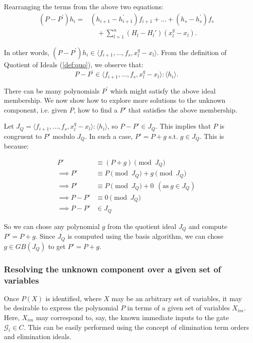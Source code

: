 Rearranging the terms from the above two equations:
\begin{equation}
  \begin{split}
(P-P^{'})h_i = &
    (h_{i+1}-h_{i+1}^{'})f_{i+1}+\dots+(h_{s}-h_{s}^{'})f_s\\
    & \quad + \sum_{l=1}^n (H_l-H_l') (x_l^q-x_l).
  \end{split}
\end{equation}

In other words, 
$(P-P^{'})h_i \in \langle f_{i+1},\dots,f_s,x_l^q-x_l\rangle$. 
From the definition of Quotient of Ideals (\autoref{def:quo}), we
observe that:
\vspace{0.1in}
\begin{equation}
\label{quotcomp}
P-P^{'} \in \langle f_{i+1},\dots,f_s,x_l^q-x_l\rangle : \langle h_i\rangle.
\end{equation}

There can be many polynomials $P^{'}$ which might satisfy the above
ideal membership. We now show how to explore more
solutions to the unknown component, i.e. given $P$, how to find a $P'$
that satisfies the above membership.  

Let $J_{Q} = \langle f_{i+1},\dots,f_s,x_l^q-x_l\rangle : \langle
h_i\rangle$, so $P - P' \in J_Q$. This implies that $P$ is congruent
to $P'$ modulo $J_Q$. In such a case, $P' = P + g$ s.t. $g\in
J_Q$. This is because:

\begin{align*}
  P' &\equiv (P + g) \pmod{J_Q}\\
\implies  P' &\equiv P \pmod{ J_Q} + g \pmod{J_Q}\\
\implies  P' &\equiv P \pmod{ J_Q} + 0 ~~(\text{as} ~g \in J_Q)  \\
\implies  P-P' &\equiv 0 \pmod{ J_Q}\\
\implies  P-P' & \in { J_Q}
\end{align*}

So we can chose any polynomial $g$ from the quotient
ideal $J_Q$ and compute $P' = P + g$. Since $J_Q$ is computed using
the \Grobner basis algorithm, we can chose $g \in GB(J_Q)$ to get $P'
= P + g$.

\subsubsection{Resolving the unknown component over a given set of
  variables} Once $P(X)$ is identified, where $X$ may be an
arbitrary set of variables, it may be desirable to express the
polynomial $P$ in terms of a given set of variables $X_{im}$. Here,
$X_{im}$ may correspond to, say, the known immediate inputs to the
gate $\mathcal{G}_i \in C$. This can be easily performed using the
concept of elimination term orders and elimination ideals.

